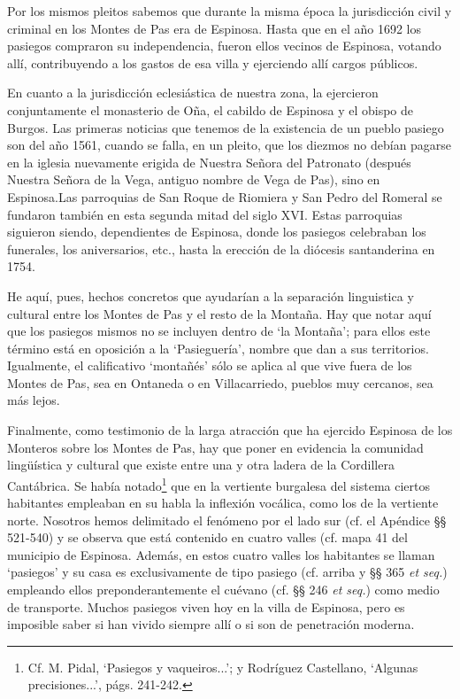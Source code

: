 \documentclass[11pt,spanish,b5paper]{book}
\begin{document}
Por los mismos pleitos sabemos que durante la misma época la jurisdicción civil y criminal en los Montes de Pas era de Espinosa. Hasta que en el año 1692 los pasiegos compraron su independencia, fueron ellos vecinos de Espinosa, votando allí, contribuyendo a los gastos de esa villa y ejerciendo allí cargos públicos.

En cuanto a la jurisdicción eclesiástica de nuestra zona, la ejercieron conjuntamente el monasterio de Oña, el cabildo de Espinosa y el obispo de Burgos. Las primeras noticias que tenemos de la existencia de un pueblo pasiego son del año 1561, cuando se falla, en un pleito, que los diezmos no debían pagarse en la iglesia nuevamente erigida de Nuestra Señora del Patronato (después Nuestra Señora de la Vega, antiguo nombre de Vega de Pas), sino en Espinosa.Las parroquias de San Roque de Riomiera y San Pedro del Romeral se fundaron también en esta segunda mitad del siglo XVI. Estas parroquias siguieron siendo, dependientes de Espinosa, donde los pasiegos celebraban los funerales, los aniversarios, etc., hasta la erección de la diócesis santanderina en 1754.

He aquí, pues, hechos concretos que ayudarían a la separación linguistica y cultural entre los Montes de Pas y el resto de la Montaña. Hay que notar aquí que los pasiegos mismos no se incluyen dentro de `la Montaña'; para ellos este término está en oposición a la `Pasieguería', nombre que dan a sus territorios. Igualmente, el calificativo `montañés' sólo se aplica al que vive fuera de los Montes de Pas, sea en Ontaneda o en Villacarriedo, pueblos muy cercanos, sea más lejos.

Finalmente, como testimonio de la larga atracción que ha ejercido Espinosa de los Monteros sobre los Montes de Pas, hay que poner en evidencia la comunidad lingüística y cultural que existe entre una y otra ladera de la Cordillera Cantábrica. Se había notado\footnote{Cf. M. Pidal, `Pasiegos y vaqueiros...'; y Rodríguez Castellano, `Algunas precisiones...', págs. 241-242.} que en la vertiente burgalesa del sistema ciertos habitantes empleaban en su habla la inflexión vocálica, como los de la vertiente norte. Nosotros hemos delimitado el fenómeno por el lado sur (cf. el Apéndice §§ 521-540) y se observa que está contenido en cuatro valles (cf. mapa 41 del municipio
de Espinosa. Además, en estos cuatro valles los habitantes se llaman `pasiegos' y su casa es exclusivamente de tipo pasiego (cf. arriba y §§ 365 \emph{et seq.}) empleando ellos preponderantemente el cuévano (cf. §§ 246 \emph{et seq.}) como medio de transporte. Muchos pasiegos viven hoy en la villa de Espinosa, pero es imposible saber si han vivido siempre allí o si son de penetración moderna.
\end{document}
